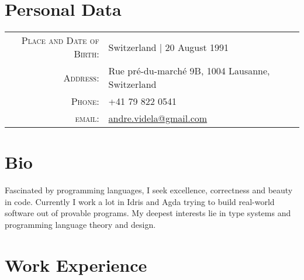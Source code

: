 \documentclass[a4paper,10pt]{article} %
\begin{document}
\pagestyle{empty} %


\par{\bigskip\par} %
\par{\bigskip\par} %
\section{Personal Data}

\begin{tabular}{rl}
\textsc{Place and Date of Birth:} & Switzerland  | 20 August 1991 \\
\textsc{Address:} & Rue pré-du-marché 9B, 1004 Lausanne, Switzerland \\
\textsc{Phone:} & +41 79 822 0541\\
\textsc{email:} & \href{mailto:andre.videla@gmail.com}{andre.videla@gmail.com}
\end{tabular}


\section{Bio}
Fascinated by programming languages, I seek excellence, correctness and beauty in code. Currently I work a lot in Idris and Agda trying to build real-world software out of provable programs. My deepest interests lie in type systems and programming language theory and design.


\section{Work Experience}
\end{document}
